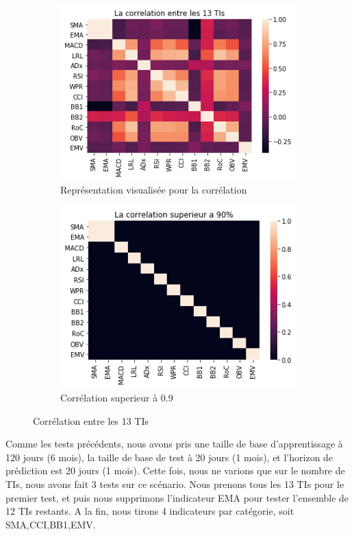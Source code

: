 \begin{figure}[H]
	\centering
	\begin{subfigure}{.5\textwidth}
	\includegraphics[width=.9\linewidth, scale=0.2]
	{plot/Corr.png}
	\caption{Représentation visualisée pour la corrélation}
	\label{fig:corr}
	\end{subfigure}%
	\begin{subfigure}{.5\textwidth}
	\centering
	\includegraphics[width=.9\linewidth, scale=0.2]
	{plot/corr_s.png}
	\caption{Corrélation superieur à 0.9}
	\label{fig:corr_s}
	\end{subfigure}
\caption{Corrélation entre les 13 TIs}
\label{fig:correlation}
\end{figure}

Comme les tests précédents, nous avons pris une taille de base d'apprentissage à 120 jours (6 mois), la taille de base de test à 20 jours (1 mois), et l'horizon de prédiction est 20 jours (1 mois). Cette fois, nous ne varions que sur le nombre de TIs, nous avons fait 3 tests sur ce scénario. Nous prenons tous les 13 TIs pour le premier test, et puis nous supprimons l'indicateur EMA pour tester l'ensemble de 12 TIs restants. A la fin, nous tirons 4 indicateurs par catégorie, soit SMA,CCI,BB1,EMV. \\

